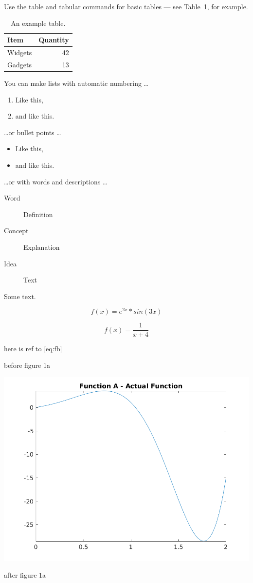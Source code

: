 \documentclass[a4paper]{article}
\begin{document}
Use the table and tabular commands for basic tables --- see Table~\ref{tab:widgets}, for example.

\begin{table}
\centering
\begin{tabular}{l|r}
Item & Quantity \\\hline
Widgets & 42 \\
Gadgets & 13
\end{tabular}
\caption{\label{tab:widgets}An example table.}
\end{table}

You can make lists with automatic numbering \dots

\begin{enumerate}
\item Like this,
\item and like this.
\end{enumerate}
\dots or bullet points \dots
\begin{itemize}
\item Like this,
\item and like this.
\end{itemize}
\dots or with words and descriptions \dots
\begin{description}
\item[Word] Definition
\item[Concept] Explanation
\item[Idea] Text
\end{description}

Some text\cite{burden2010}.

\begin{equation}
f(x) = e^{2x} * sin(3x)
\label{eq:fa}
\end{equation}

\begin{equation}
f(x) = \frac{1}{x+4}
\label{eq:fb}
\end{equation}

here is ref to \ref{eq:fb}


before figure 1a
\begin{center}
	\includegraphics[width=1\textwidth]{../output/a_actual.png}
	\label{fig:figa}
\end{center}
after figure 1a
\end{document}
